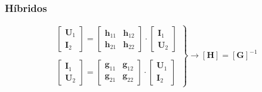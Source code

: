 \subsubsection{Híbridos}
\label{sec:org34b878b}
\[
  \left.
    \begin{array}{l}
  \left[
    \begin{array}{c}
      \mathbf{U}_1\\
      \mathbf{I}_2
    \end{array}
  \right] =
  \left[
    \begin{array}{cc}
      \mathbf{h}_{11} & \mathbf{h}_{12}\\
      \mathbf{h}_{21} & \mathbf{h}_{22}
    \end{array}
  \right] \cdot
  \left[
    \begin{array}{c}
      \mathbf{I}_1\\
      \mathbf{U}_2
    \end{array}
      \right]
      \\ \\
  \left[
    \begin{array}{c}
      \mathbf{I}_1\\
      \mathbf{U}_2
    \end{array}
  \right] =
  \left[
    \begin{array}{cc}
      \mathbf{g}_{11} & \mathbf{g}_{12}\\
      \mathbf{g}_{21} & \mathbf{g}_{22}
    \end{array}
  \right] \cdot
  \left[
    \begin{array}{c}
      \mathbf{U}_1\\
      \mathbf{I}_2
    \end{array}
      \right]
      \end{array}
    \right\}
      \rightarrow
      \boxed{[\mathbf{H}] = [\mathbf{G}]^{-1}}
    \]
